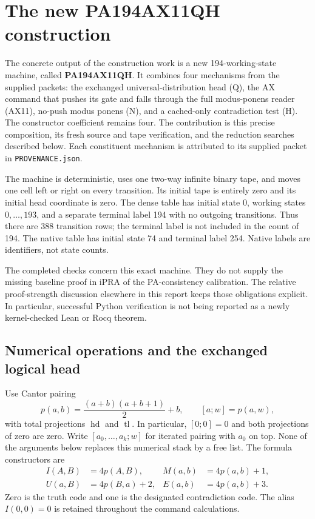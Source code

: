 \section{The new PA194AX11QH construction}
\label{sec:ax11qh-construction}

The concrete output of the construction work is a new 194-working-state
machine, called \textbf{PA194AX11QH}. It combines four mechanisms from the
supplied packets: the exchanged universal-distribution head (Q), the
AX command that pushes its gate and falls through the full modus-ponens
reader (AX11), no-push modus ponens (N), and a cached-only contradiction
test (H). The constructor coefficient remains four. The contribution is
this precise composition, its fresh source and tape verification, and the
reduction searches described below. Each constituent mechanism is
attributed to its supplied packet in \texttt{PROVENANCE.json}.

The machine is deterministic, uses one two-way infinite binary tape,
and moves one cell left or right on every transition. Its initial tape
is entirely zero and its initial head coordinate is zero. The dense table
has initial state 0, working states $0,\ldots,193$, and a separate terminal
label 194 with no outgoing transitions. Thus there are 388 transition rows;
the terminal label is not included in the count of 194. The native table
has initial state 74 and terminal label 254. Native labels are identifiers,
not state counts.

The completed checks concern this exact machine. They do not supply the
missing baseline proof in iPRA of the PA-consistency calibration. The
relative proof-strength discussion elsewhere in this report keeps those
obligations explicit. In particular, successful Python verification is
not being reported as a newly kernel-checked Lean or Rocq theorem.

\subsection{Numerical operations and the exchanged logical head}

Use Cantor pairing
\[
 p(a,b)=\frac{(a+b)(a+b+1)}2+b,
 \qquad [a;w]=p(a,w),
\]
with total projections $\operatorname{hd}$ and $\operatorname{tl}$. In
particular, $[0;0]=0$ and both projections of zero are zero. Write
$[a_0,\ldots,a_k;w]$ for iterated pairing with $a_0$ on top. None of the
arguments below replaces this numerical stack by a free list.
The formula constructors are
\[
 \begin{aligned}
 I(A,B)&=4p(A,B), & M(a,b)&=4p(a,b)+1,\\
 U(a,B)&=4p(B,a)+2, & E(a,b)&=4p(a,b)+3.
 \end{aligned}
\]
Zero is the truth code and one is the designated contradiction code.
The alias $I(0,0)=0$ is retained throughout the command calculations.

